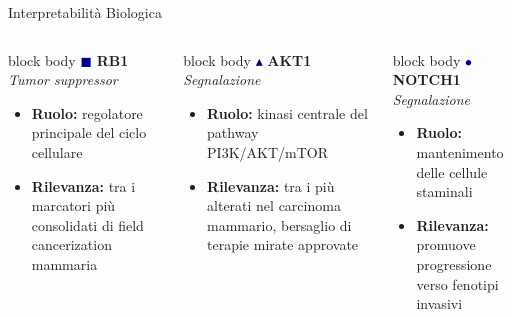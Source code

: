 \documentclass{beamer}
\begin{document}
\begin{frame}{Interpretabilità Biologica}

\begin{columns}[t, onlytextwidth]


\begin{beamercolorbox}[rounded=true, sep=6pt]{block body}
{\large \textcolor{darkblue}{$\blacksquare$}}\;
\textbf{RB1} \hfill {\scriptsize \textit{Tumor suppressor}}\\[3pt]
{\scriptsize
\begin{itemize}
  \item \textbf{Ruolo:} regolatore principale del ciclo cellulare
  \item \textbf{Rilevanza:} tra i marcatori più consolidati di field cancerization mammaria
\end{itemize}
}
\end{beamercolorbox}

\vspace{0.5em}



\begin{beamercolorbox}[rounded=true, sep=6pt]{block body}
{\large \textcolor{darkblue}{$\blacktriangle$}}\;
\textbf{AKT1} \hfill {\scriptsize \textit{Segnalazione}}\\[3pt]
{\scriptsize
\begin{itemize}
  \item \textbf{Ruolo:} kinasi centrale del pathway PI3K/AKT/mTOR
  \item \textbf{Rilevanza:} tra i più alterati nel carcinoma mammario, bersaglio di terapie mirate approvate
\end{itemize}
}
\end{beamercolorbox}


\begin{beamercolorbox}[rounded=true, sep=6pt]{block body}
{\large \textcolor{darkblue}{$\bullet$}}\;
\textbf{NOTCH1} \hfill {\scriptsize \textit{Segnalazione}}\\[3pt]
{\scriptsize
\begin{itemize}
  \item \textbf{Ruolo:} mantenimento delle cellule staminali 
  \item \textbf{Rilevanza:} promuove progressione verso fenotipi invasivi
\end{itemize}
}
\end{beamercolorbox}


\end{columns}
\end{frame}
\end{document}
